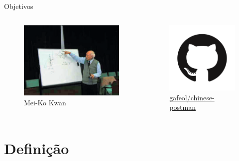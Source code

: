 \documentclass{beamer}
\begin{document}
\begin{frame}{Objetivos}
\begin{columns}
            \center
            \begin{figure}
                \includegraphics[width=.7\textwidth]{meigu.png}
                \caption{\small Mei-Ko Kwan}
            \end{figure}
            \begin{figure}
                 \includegraphics[width=.5\textwidth]{github.png}
                 \caption{\small \href{https://github.com/gafeol/chinese-postman}{gafeol/chinese-postman}}
            \end{figure}
    \end{columns}

\end{frame}

\section{Definição}
\end{document}
